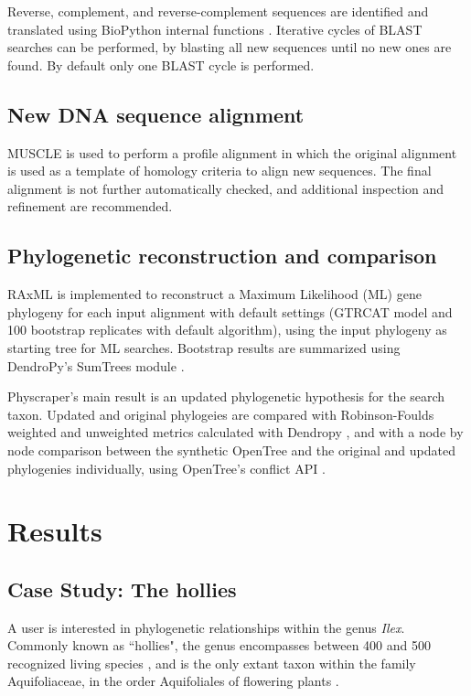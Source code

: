 \documentclass{bmcart}
\begin{document}
Reverse, complement, and reverse-complement sequences are identified and translated
using BioPython internal functions \cite{cock2009biopython}.
Iterative cycles of BLAST searches can be performed, by blasting all new sequences
until no new ones are found. By default only one BLAST cycle is performed.

\subsection*{New DNA sequence alignment}

MUSCLE \cite{edgar2004muscle} is used to perform a profile alignment in which the
original alignment is used as a template of homology criteria to align new sequences.
The final alignment is not further automatically checked, and additional inspection
and refinement are recommended.

\subsection*{Phylogenetic reconstruction and comparison}

RAxML \cite{stamatakis2014raxml} is implemented to reconstruct a Maximum Likelihood
(ML) gene phylogeny for each input alignment with default settings (GTRCAT model and
100 bootstrap replicates with default algorithm), using the input phylogeny as starting
tree for ML searches.
Bootstrap results are summarized using DendroPy's SumTrees module
\cite{sukumaran2010dendropy}.

Physcraper's main result is an updated phylogenetic hypothesis for the search taxon.
Updated and original phylogeies are compared with Robinson-Foulds weighted and unweighted
metrics calculated with Dendropy \cite{sukumaran2010dendropy}, and with a node by node
comparison between the synthetic OpenTree and the original and updated phylogenies individually,
using OpenTree's conflict API \cite{redelings2017supertree}.


\section*{Results}
\subsection*{Case Study: The hollies}

A user is interested in phylogenetic relationships within the genus \textit{Ilex}. Commonly
known as ``hollies", the genus encompasses between 400 \cite{gottlieb2005molecular}
and 500 recognized living species \cite{plantlist}, and is
the only extant taxon within the family Aquifoliaceae, in the order Aquifoliales of flowering
plants \cite{chase2016update}.
\end{document}
